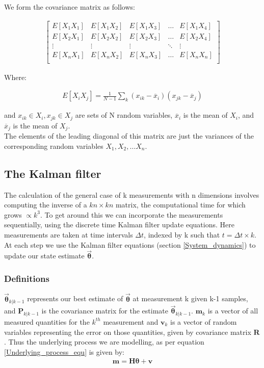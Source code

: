 \documentclass[a4paper]{article}
\begin{document}
		\noindent We form the covariance matrix as follows:
		
		\begin{align} \label{Covariance_matrix}
			\begin{bmatrix}
				E[X_1X_1] & E[X_1X_2] & E[X_1X_3] & \dots  & E[X_1X_4] \\
				E[X_2X_1] & E[X_2X_2] & E[X_2X_3] & \dots  & E[X_2X_4] \\
				\vdots & \vdots & \vdots & \ddots & \vdots \\
				E[X_nX_1] & E[X_nX_2] & E[X_nX_3] & \dots  & E[X_nX_n] \\
			\end{bmatrix}
		\end{align}
		
		\noindent Where:
		
		\begin{align} \label{Covariance_equ}
			E[X_iX_j]=\frac{1}{N-1}\sum_{k}(x_{ik}-\overline{x}_i)(x_{jk}-\overline{x}_j)
		\end{align}
		
		\noindent and $x_{ik} \in X_i, x_{jk}\in X_j$ are sets of N random variables, $\overline{x}_i$ is the mean of $X_i$, and $\overline{x}_j$ is the mean of $X_j$.\\
		
		\noindent The elements of the leading diagonal of this matrix are just the variances of the corresponding random variables $X_1, X_2, \dots X_n$.
	
	\subsection{The Kalman filter}\label{The_Kalman_filter}
	The calculation of the general case of k measurements with n dimensions involves computing the inverse of a $kn \times kn$ matrix, the computational time for which grows $\propto k^3$. To get around this we can incorporate the measurements sequentially, using the discrete time Kalman filter update equations. Here measurements are taken at time intervals $\Delta t$, indexed by k such that $t=\Delta t \times k$. At each step we use the Kalman filter equations (section \ref{System_dynamics}) to update our state estimate $\bm{\vec{\theta}}$.
		\subsubsection{Definitions}\label{Definitions}
		$\bm{\vec{\theta}}_{k|k-1}$ represents our best estimate of $\bm{\vec{\theta}}$ at measurement k given k-1 samples, and $\bm{P}_{k|k-1}$ is the covariance matrix for the estimate $\bm{\vec{\theta}}_{k|k-1}$. $\bm{m}_k$ is a vector of all measured quantities for the $k^{th}$ measurement and $\bm{v}_k$ is a vector of random variables representing the error on those quantities, given by covariance matrix $\bm{R}$. Thus the underlying process we are modelling, as per equation \ref{Underlying_process_equ} is given by:
		\begin{align}
			\bm{m}=\bm{H\theta}+\bm{v}
		\end{align}
	
\end{document}
